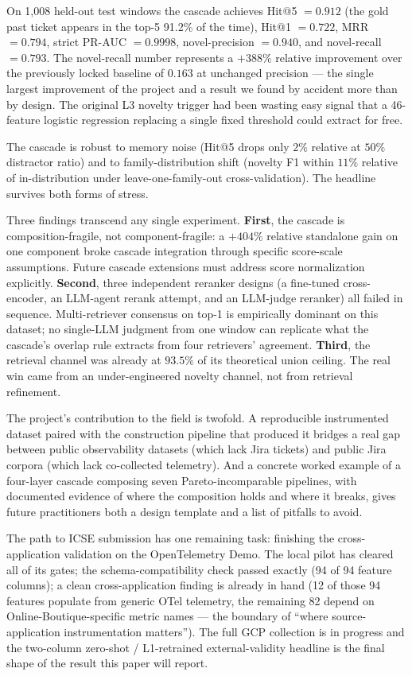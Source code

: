 On 1{,}008 held-out test windows the cascade achieves Hit@5 $= 0.912$ (the gold past ticket appears in the top-5 91.2\% of the time), Hit@1 $= 0.722$, MRR $= 0.794$, strict PR-AUC $= 0.9998$, novel-precision $= 0.940$, and novel-recall $= 0.793$. The novel-recall number represents a $+388\%$ relative improvement over the previously locked baseline of $0.163$ at unchanged precision --- the single largest improvement of the project and a result we found by accident more than by design. The original L3 novelty trigger had been wasting easy signal that a 46-feature logistic regression replacing a single fixed threshold could extract for free.

The cascade is robust to memory noise (Hit@5 drops only $2\%$ relative at $50\%$ distractor ratio) and to family-distribution shift (novelty F1 within $11\%$ relative of in-distribution under leave-one-family-out cross-validation). The headline survives both forms of stress.

Three findings transcend any single experiment. \textbf{First}, the cascade is composition-fragile, not component-fragile: a $+404\%$ relative standalone gain on one component broke cascade integration through specific score-scale assumptions. Future cascade extensions must address score normalization explicitly. \textbf{Second}, three independent reranker designs (a fine-tuned cross-encoder, an LLM-agent rerank attempt, and an LLM-judge reranker) all failed in sequence. Multi-retriever consensus on top-1 is empirically dominant on this dataset; no single-LLM judgment from one window can replicate what the cascade's overlap rule extracts from four retrievers' agreement. \textbf{Third}, the retrieval channel was already at $93.5\%$ of its theoretical union ceiling. The real win came from an under-engineered novelty channel, not from retrieval refinement.

The project's contribution to the field is twofold. A reproducible instrumented dataset paired with the construction pipeline that produced it bridges a real gap between public observability datasets (which lack Jira tickets) and public Jira corpora (which lack co-collected telemetry). And a concrete worked example of a four-layer cascade composing seven Pareto-incomparable pipelines, with documented evidence of where the composition holds and where it breaks, gives future practitioners both a design template and a list of pitfalls to avoid.

The path to ICSE submission has one remaining task: finishing the cross-application validation on the OpenTelemetry Demo. The local pilot has cleared all of its gates; the schema-compatibility check passed exactly (94 of 94 feature columns); a clean cross-application finding is already in hand (12 of those 94 features populate from generic OTel telemetry, the remaining 82 depend on Online-Boutique-specific metric names --- the boundary of ``where source-application instrumentation matters''). The full GCP collection is in progress and the two-column zero-shot / L1-retrained external-validity headline is the final shape of the result this paper will report.
